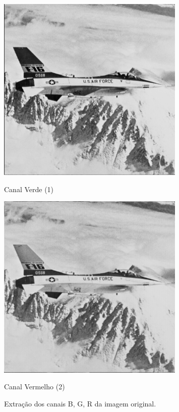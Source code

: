 \documentclass[a4paper, 11pt, portuguese]{article}
\begin{document}
\begin{figure}[htbp]
\vspace{0.5cm} %
\begin{minipage}{0.48\textwidth}
    \centering
    \includegraphics[width=0.8\textwidth]{imagens/airplane_extract_1.png}
    \caption*{Canal Verde (1)}
\end{minipage}
\hfill
\begin{minipage}{0.48\textwidth}
    \centering
    \includegraphics[width=0.8\textwidth]{imagens/airplane_extract_2.png}
    \caption*{Canal Vermelho (2)}
\end{minipage}
\caption{Extração dos canais B, G, R da imagem original.}
\label{fig:canais_extraidos}
\end{figure}
\end{document}
